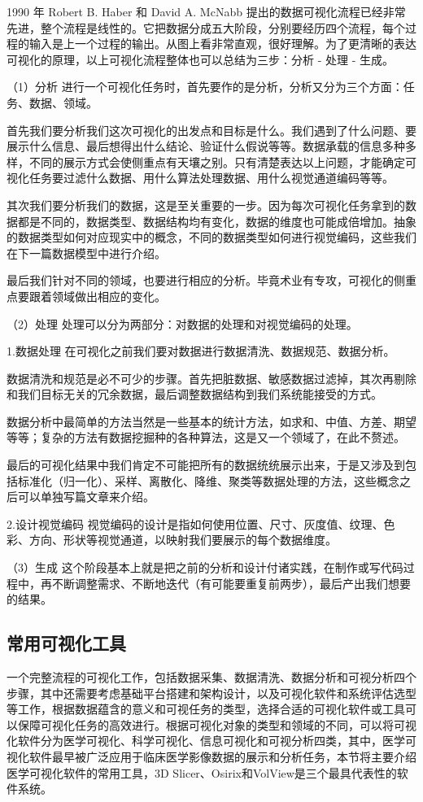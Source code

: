 \documentclass[lang=cn,color=black,10pt,founder,newtx]{elegantbook}
\begin{document}
1990 年 Robert B. Haber 和 David A. McNabb 提出的数据可视化流程已经非常先进，整个流程是线性的。它把数据分成五大阶段，分别要经历四个流程，每个过程的输入是上一个过程的输出。从图上看非常直观，很好理解。为了更清晰的表达可视化的原理，以上可视化流程整体也可以总结为三步：分析 - 处理 - 生成。

（1）分析
进行一个可视化任务时，首先要作的是分析，分析又分为三个方面：任务、数据、领域。

首先我们要分析我们这次可视化的出发点和目标是什么。我们遇到了什么问题、要展示什么信息、最后想得出什么结论、验证什么假说等等。数据承载的信息多种多样，不同的展示方式会使侧重点有天壤之别。只有清楚表达以上问题，才能确定可视化任务要过滤什么数据、用什么算法处理数据、用什么视觉通道编码等等。

其次我们要分析我们的数据，这是至关重要的一步。因为每次可视化任务拿到的数据都是不同的，数据类型、数据结构均有变化，数据的维度也可能成倍增加。抽象的数据类型如何对应现实中的概念，不同的数据类型如何进行视觉编码，这些我们在下一篇数据模型中进行介绍。

最后我们针对不同的领域，也要进行相应的分析。毕竟术业有专攻，可视化的侧重点要跟着领域做出相应的变化。

（2）处理
处理可以分为两部分：对数据的处理和对视觉编码的处理。

1.数据处理
在可视化之前我们要对数据进行数据清洗、数据规范、数据分析。

数据清洗和规范是必不可少的步骤。首先把脏数据、敏感数据过滤掉，其次再剔除和我们目标无关的冗余数据，最后调整数据结构到我们系统能接受的方式。

数据分析中最简单的方法当然是一些基本的统计方法，如求和、中值、方差、期望等等；复杂的方法有数据挖掘种的各种算法，这是又一个领域了，在此不赘述。

最后的可视化结果中我们肯定不可能把所有的数据统统展示出来，于是又涉及到包括标准化（归一化）、采样、离散化、降维、聚类等数据处理的方法，这些概念之后可以单独写篇文章来介绍。

2.设计视觉编码
视觉编码的设计是指如何使用位置、尺寸、灰度值、纹理、色彩、方向、形状等视觉通道，以映射我们要展示的每个数据维度。

（3）生成
这个阶段基本上就是把之前的分析和设计付诸实践，在制作或写代码过程中，再不断调整需求、不断地迭代（有可能要重复前两步），最后产出我们想要的结果。

\subsection{常用可视化工具}

一个完整流程的可视化工作，包括数据采集、数据清洗、数据分析和可视分析四个步骤，其中还需要考虑基础平台搭建和架构设计，以及可视化软件和系统评估选型等工作，根据数据蕴含的意义和可视任务的类型，选择合适的可视化软件或工具可以保障可视化任务的高效进行。根据可视化对象的类型和领域的不同，可以将可视化软件分为医学可视化、科学可视化、信息可视化和可视分析四类，其中，医学可视化软件最早被广泛应用于临床医学影像数据的展示和分析任务，本节将主要介绍医学可视化软件的常用工具，3D Slicer、Osirix和VolView是三个最具代表性的软件系统。
\end{document}
